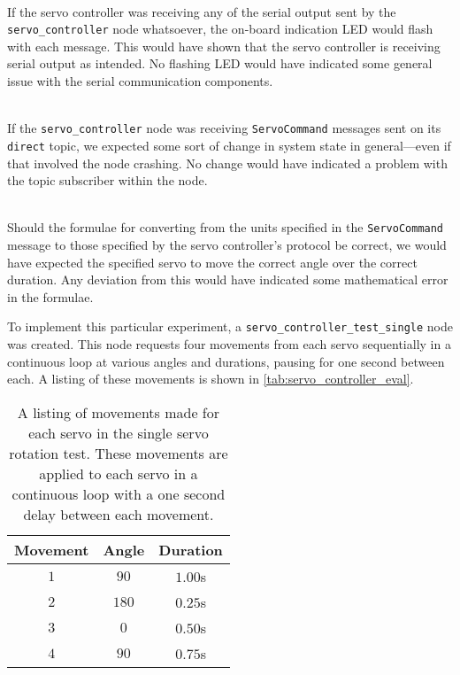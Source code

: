 \begin{description}[labelindent=\parindent]
	\item[Hardware Communication] \hfill \\
	If the servo controller was receiving any of the serial output sent by the \texttt{servo\_controller} node whatsoever, the on-board indication LED would flash with each message. This would have shown that the servo controller is receiving serial output as intended. No flashing LED would have indicated some general issue with the serial communication components.

	\item[Topic Reception] \hfill \\
	If the \texttt{servo\_controller} node was receiving \texttt{ServoCommand} messages sent on its \texttt{direct} topic, we expected some sort of change in system state in general---even if that involved the node crashing. No change would have indicated a problem with the topic subscriber within the node.

	\item[Index, Angle \& Duration Conversion] \hfill \\
	Should the formulae for converting from the units specified in the \texttt{ServoCommand} message to those specified by the servo controller's protocol be correct, we would have expected the specified servo to move the correct angle over the correct duration. Any deviation from this would have indicated some mathematical error in the formulae.
\end{description}

To implement this particular experiment, a \texttt{servo\_controller\_test\_single} node was created. This node requests four movements from each servo sequentially in a continuous loop at various angles and durations, pausing for one second between each. A listing of these movements is shown in \autoref{tab:servo_controller_eval}.

\begin{table}[!h]
	\centering
	\begin{tabular}{ c c c }
		\toprule
		\textbf{Movement} & \textbf{Angle} & \textbf{Duration} \\
		\midrule

		$1$ &
		$90$\textdegree{} &
		$1.00$s \\

		$2$ &
		$180$\textdegree{} &
		$0.25$s \\

		$3$ &
		$0$\textdegree{} &
		$0.50$s \\

		$4$ &
		$90$\textdegree{} &
		$0.75$s \\
		\bottomrule
	\end{tabular}
	\caption{A listing of movements made for each servo in the single servo rotation test. These movements are applied to each servo in a continuous loop with a one second delay between each movement.}
	\label{tab:servo_controller_eval}
\end{table}

